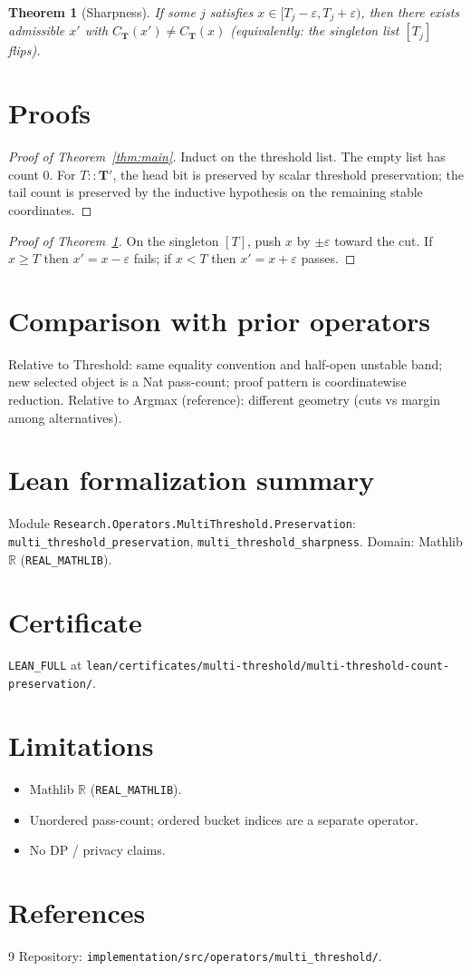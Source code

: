 \documentclass[11pt]{article}
\newtheorem{theorem}{Theorem}
\begin{document}
\begin{theorem}[Sharpness]\label{thm:sharp}
If some \(j\) satisfies \(x\in[T_j-\varepsilon,T_j+\varepsilon)\), then there exists
admissible \(x'\) with \(C_{\mathbf{T}}(x')\ne C_{\mathbf{T}}(x)\)
(equivalently: the singleton list \([T_j]\) flips).
\end{theorem}

\section{Proofs}
\begin{proof}[Proof of Theorem~\ref{thm:main}]
Induct on the threshold list. The empty list has count \(0\).
For \(T::\mathbf{T}'\), the head bit is preserved by scalar threshold preservation;
the tail count is preserved by the inductive hypothesis on the remaining stable
coordinates.
\end{proof}

\begin{proof}[Proof of Theorem~\ref{thm:sharp}]
On the singleton \([T]\), push \(x\) by \(\pm\varepsilon\) toward the cut.
If \(x\ge T\) then \(x'=x-\varepsilon\) fails; if \(x<T\) then \(x'=x+\varepsilon\) passes.
\end{proof}

\section{Comparison with prior operators}
Relative to Threshold: same equality convention and half-open unstable band;
new selected object is a Nat pass-count; proof pattern is coordinatewise reduction.
Relative to Argmax (reference): different geometry (cuts vs margin among alternatives).

\section{Lean formalization summary}
Module \texttt{Research.Operators.MultiThreshold.Preservation}:
\texttt{multi\_threshold\_preservation}, \texttt{multi\_threshold\_sharpness}.
Domain: Mathlib $\mathbb{R}$ (\texttt{REAL\_MATHLIB}).

\section{Certificate}
\texttt{LEAN\_FULL} at
\texttt{lean/certificates/multi-threshold/multi-threshold-count-preservation/}.

\section{Limitations}
\begin{itemize}
\item Mathlib \(\mathbb{R}\) (\texttt{REAL\_MATHLIB}).
\item Unordered pass-count; ordered bucket indices are a separate operator.
\item No DP / privacy claims.
\end{itemize}

\section*{References}
\begin{thebibliography}{9}
Repository: \texttt{implementation/src/operators/multi\_threshold/}.
\end{thebibliography}
\end{document}
